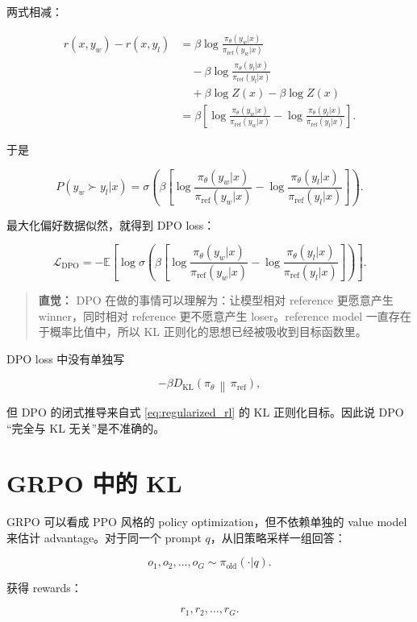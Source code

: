 \documentclass[11pt,a4paper]{ctexart}
\newcommand{\KL}[2]{D_{\mathrm{KL}}\!\left(#1\,\middle\|\,#2\right)}
\newcommand{\E}{\mathbb{E}}
\newcommand{\piold}{\pi_{\mathrm{old}}}
\newcommand{\piref}{\pi_{\mathrm{ref}}}
\newcommand{\pitheta}{\pi_{\theta}}
\newenvironment{intuition}
{\begin{quote}\small\textbf{直觉：}}
{\end{quote}}
\begin{document}
两式相减：

\begin{align}
r(x,y_w)-r(x,y_l)
&=
\beta
\log
\frac{\pitheta(y_w|x)}{\piref(y_w|x)}
\\
&\quad
-
\beta
\log
\frac{\pitheta(y_l|x)}{\piref(y_l|x)}
\\
&\quad
+
\beta\log Z(x)
-
\beta\log Z(x)
\\
&=
\beta
\left[
\log
\frac{\pitheta(y_w|x)}{\piref(y_w|x)}
-
\log
\frac{\pitheta(y_l|x)}{\piref(y_l|x)}
\right].
\end{align}

于是

\begin{equation}
P(y_w\succ y_l|x)
=
\sigma
\left(
\beta
\left[
\log
\frac{\pitheta(y_w|x)}{\piref(y_w|x)}
-
\log
\frac{\pitheta(y_l|x)}{\piref(y_l|x)}
\right]
\right).
\end{equation}

最大化偏好数据似然，就得到 DPO loss：

\begin{equation}
\boxed{
\mathcal{L}_{\mathrm{DPO}}
=
-
\E
\left[
\log
\sigma
\left(
\beta
\left[
\log
\frac{\pitheta(y_w|x)}{\piref(y_w|x)}
-
\log
\frac{\pitheta(y_l|x)}{\piref(y_l|x)}
\right]
\right)
\right].
}
\end{equation}

\begin{intuition}
DPO 在做的事情可以理解为：让模型相对 reference 更愿意产生 winner，同时相对 reference 更不愿意产生 loser。reference model 一直存在于概率比值中，所以 KL 正则化的思想已经被吸收到目标函数里。
\end{intuition}

DPO loss 中没有单独写

\[
-\beta\KL{\pitheta}{\piref},
\]

但 DPO 的闭式推导来自式 \eqref{eq:regularized_rl} 的 KL 正则化目标。因此说 DPO “完全与 KL 无关”是不准确的。

\section{GRPO 中的 KL}

GRPO 可以看成 PPO 风格的 policy optimization，但不依赖单独的 value model 来估计 advantage。对于同一个 prompt $q$，从旧策略采样一组回答：

\[
o_1,o_2,\ldots,o_G
\sim
\piold(\cdot|q).
\]

获得 rewards：

\[
r_1,r_2,\ldots,r_G.
\]
\end{document}

